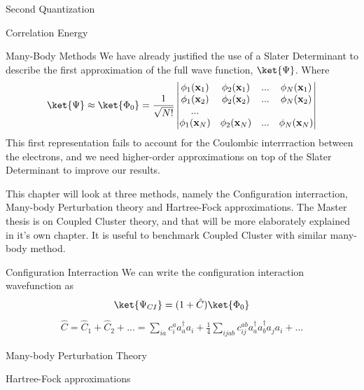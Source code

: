 \documentclass[twoside,english]{uiofysmaster}
\begin{document}
\begin{chapter}{Second Quantization}
\begin{section}{Correlation Energy}
	\end{section}
 
\end{chapter}




\begin{chapter}{Many-Body Methods}
	We have already justified the use of a Slater Determinant to describe the first approximation of the full wave function, $\ket{\Psi}$. Where
	\begin{align}
		\ket{\Psi} \approx \ket{\Phi_0} = 	\frac{1}{ \sqrt{N!} } \left|\begin{matrix}
			\phi_1(\mathbf{x}_1) & \phi_2(\mathbf{x}_1) & ... & \phi_N(\mathbf{x}_1) \\
			\phi_1(\mathbf{x}_2) & \phi_2(\mathbf{x}_2) & ... & \phi_N(\mathbf{x}_2) \\
			... & & & \\
			\phi_1(\mathbf{x}_N) & \phi_2(\mathbf{x}_N) & ... & \phi_N(\mathbf{x}_N) 
		\end{matrix} \right|
	\end{align}	
	This first representation fails to account for the Coulombic interrraction between the electrons, and we need higher-order approximations on top 
	of the Slater Determinant to improve our results. \par
	This chapter will look at three methods, namely the Configuration interraction, Many-body Perturbation theory and Hartree-Fock approximations. The
	Master thesis is on Coupled Cluster theory, and that will be more elaborately explained in it's own chapter. It is useful to benchmark Coupled Cluster 
	with similar many-body method. 

 \begin{section}{Configuration Interraction}
 		We can write the configuration interaction wavefunction as 
  	\begin{align}
  		\ket{\Psi_{CI}} = (1 + \hat C) \ket{\Phi_0} 
   	\end{align}
  	\begin{align}
  		\hat C = \hat C_1 + \hat C_2 + ... =  \sum_{ia} c_i^a a_a^{\dagger} a_i + \frac{1}{4} \sum_{ijab} c_{ij}^{ab} a_a^{\dagger} a_b^{\dagger} a_j a_i + ...
   	\end{align}
 \end{section}	

 \begin{section}{Many-body Perturbation Theory}
 	
 \end{section}

 \begin{section}{Hartree-Fock approximations}
 	
 \end{section}

\end{chapter}
\end{document}
